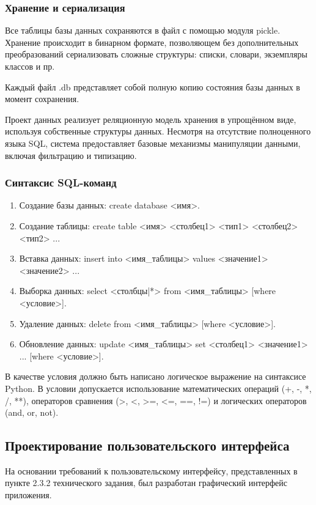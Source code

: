 \subsubsection{Хранение и сериализация}

Все таблицы базы данных сохраняются в файл с помощью модуля pickle. Хранение происходит в бинарном формате, позволяющем без дополнительных преобразований сериализовать сложные структуры: списки, словари, экземпляры классов и пр.

Каждый файл .db представляет собой полную копию состояния базы данных в момент сохранения.

Проект данных реализует реляционную модель хранения в упрощённом виде, используя собственные структуры данных. Несмотря на отсутствие полноценного языка SQL, система предоставляет базовые механизмы манипуляции данными, включая фильтрацию и типизацию.

\subsubsection{Синтаксис SQL-команд}

\begin{enumerate}
	\item Создание базы данных: create database <имя>.
	\item Создание таблицы: create table <имя> <столбец1> <тип1> <столбец2> <тип2> ...
	\item Вставка данных: insert into <имя\_таблицы> values <значение1> <значение2> ... 
	\item Выборка данных: select <столбцы|*> from <имя\_таблицы> [where <условие>].
	\item Удаление данных: delete from <имя\_таблицы> [where <условие>].
	\item Обновление данных: update <имя\_таблицы> set <столбец1> <значение1> ... [where <условие>].	
\end{enumerate}

В качестве условия должно быть написано логическое выражение на синтаксисе Python. В условии допускается использование математических операций (+, -, *, /, **), операторов сравнения (>, <, >=, <=, ==, !=) и логических операторов (and, or, not).

\subsection{Проектирование пользовательского интерфейса}

На основании требований к пользовательскому интерфейсу, представленных в пункте 2.3.2 технического задания, был разработан графический интерфейс приложения.

